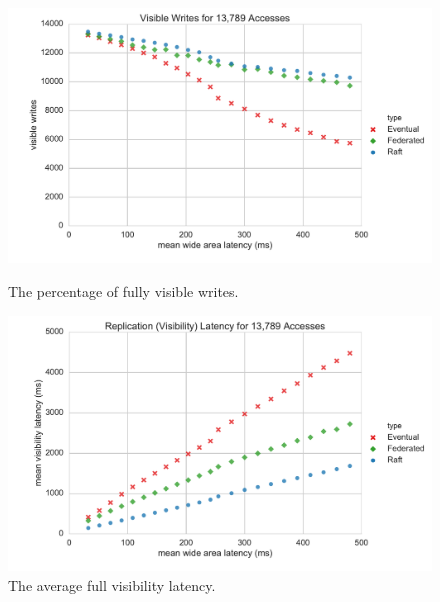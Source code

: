 \documentclass[10pt,conference,compsocconf,letterpaper]{IEEEtran}
\begin{document}
\begin{figure}
    \centering
      \includegraphics[width=\linewidth]{figures/latency/visible_writes}
      \caption{The percentage of fully visible writes.}\label{fig:visible_writes}
    \endminipage\hfill
      \includegraphics[width=\linewidth]{figures/latency/visibility_latency}
      \caption{The average full visibility latency.}\label{fig:visibility_latency}
    \endminipage\hfill
\end{figure}
\end{document}
